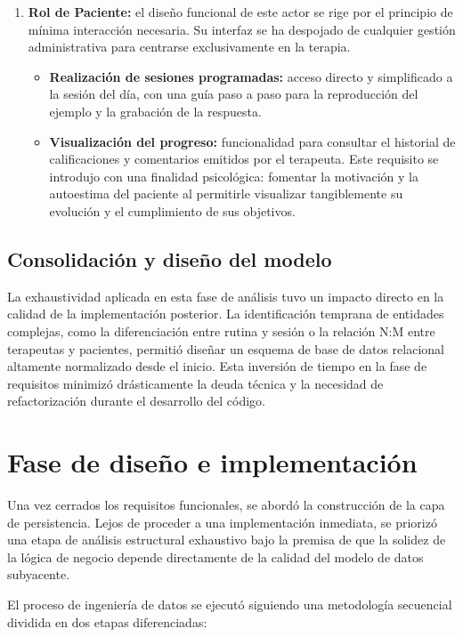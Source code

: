 \begin{enumerate}
    \item \textbf{Rol de Paciente:} el diseño funcional de este actor se rige por el principio de mínima interacción necesaria. Su interfaz se ha despojado de cualquier gestión administrativa para centrarse exclusivamente en la terapia.
    \begin{itemize}
        \item \textbf{Realización de sesiones programadas:} acceso directo y simplificado a la sesión del día, con una guía paso a paso para la reproducción del ejemplo y la grabación de la respuesta.
        \item \textbf{Visualización del progreso:} funcionalidad para consultar el historial de calificaciones y comentarios emitidos por el terapeuta. Este requisito se introdujo con una finalidad psicológica: fomentar la motivación y la autoestima del paciente al permitirle visualizar tangiblemente su evolución y el cumplimiento de sus objetivos.
    \end{itemize}
\end{enumerate}

\subsection{Consolidación y diseño del modelo}

La exhaustividad aplicada en esta fase de análisis tuvo un impacto directo en la calidad de la implementación posterior. La identificación temprana de entidades complejas, como la diferenciación entre rutina y sesión o la relación N:M entre terapeutas y pacientes, permitió diseñar un esquema de base de datos relacional altamente normalizado desde el inicio. Esta inversión de tiempo en la fase de requisitos minimizó drásticamente la deuda técnica y la necesidad de refactorización durante el desarrollo del código.

\section{Fase de diseño e implementación}

Una vez cerrados los requisitos funcionales, se abordó la construcción de la capa de persistencia. Lejos de proceder a una implementación inmediata, se priorizó una etapa de análisis estructural exhaustivo bajo la premisa de que la solidez de la lógica de negocio depende directamente de la calidad del modelo de datos subyacente.

El proceso de ingeniería de datos se ejecutó siguiendo una metodología secuencial dividida en dos etapas diferenciadas:

